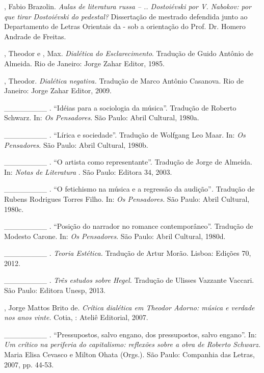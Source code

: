 \begin{Parskip}
, Fabio Brazolin. \emph{Aulas de literatura russa -- ..
Dostoiévski por V. Nabokov: por que tirar Dostoiévski do pedestal?}
Dissertação de mestrado defendida junto ao Departamento de Letras
Orientais da - sob a orientação do Prof. Dr. Homero Andrade de
Freitas.

, Theodor e , Max. \emph{Dialética do Esclarecimento}.
Tradução de Guido Antônio de Almeida. Rio de Janeiro: Jorge Zahar
Editor, 1985.

, Theodor. \emph{Dialética negativa.} Tradução de Marco Antônio
Casanova. Rio de Janeiro: Jorge Zahar Editor, 2009.

\_\_\_\_\_\_\_\_ . ``Idéias para a sociologia da música''. Tradução de
Roberto Schwarz. In: \emph{Os Pensadores}. São Paulo: Abril Cultural,
1980a.

\_\_\_\_\_\_\_\_ . ``Lírica e sociedade''. Tradução de Wolfgang Leo
Maar. In: \emph{Os Pensadores}. São Paulo: Abril Cultural, 1980b.

\_\_\_\_\_\_\_\_ . ``O artista como representante''. Tradução de Jorge
de Almeida. In: \emph{Notas de Literatura }. São Paulo: Editora 34,
2003.

\_\_\_\_\_\_\_\_ . ``O fetichismo na música e a regressão da
audição''\emph{.} Tradução de Rubens Rodrigues Torres Filho. In:
\emph{Os Pensadores.} São Paulo: Abril Cultural, 1980c.

\_\_\_\_\_\_\_\_ . ``Posição do narrador no romance contemporâneo''.
Tradução de Modesto Carone. In: \emph{Os Pensadores}. São Paulo: Abril
Cultural, 1980d.

\_\_\_\_\_\_\_\_ . \emph{Teoria Estética.} Tradução de Artur Morão.
Lisboa: Edições 70, 2012.

\_\_\_\_\_\_\_\_ . \emph{Três estudos sobre Hegel.} Tradução de Ulisses
Vazzante Vaccari. São Paulo: Editora Unesp, 2013.

, Jorge Mattos Brito de. \emph{Crítica dialética em Theodor
Adorno: música e verdade nos anos vinte.} Cotia, : Ateliê Editorial,
2007.

\_\_\_\_\_\_\_\_ . ``Pressupostos, salvo engano, dos pressupostos, salvo
engano''. In: \emph{Um crítico na periferia do capitalismo: reflexões
sobre a obra de Roberto Schwarz.} Maria Elisa Cevasco e Milton Ohata
(Orgs.). São Paulo: Companhia das Letras, 2007, pp. 44-53.


\end{Parskip}
